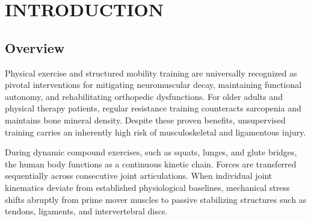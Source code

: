 \documentclass[12pt,a4paper]{report}
\begin{document}
\renewcommand*{\contentsname}{\MakeUppercase{Contents}}
\renewcommand*{\listfigurename}{\MakeUppercase{List of Figures}}
\renewcommand*{\listtablename}{\MakeUppercase{List of Tables}}
\renewcommand{\bibname}{REFERENCES}

\tableofcontents
\clearpage

\begingroup
{}
\listoffigures
\clearpage
\endgroup

\begingroup
{}
\listoftables
\clearpage
\endgroup

\renewcommand{\chaptername}{CHAPTER}

\chapter{INTRODUCTION}
\section{Overview}
Physical exercise and structured mobility training are universally recognized as pivotal interventions for mitigating neuromuscular decay, maintaining functional autonomy, and rehabilitating orthopedic dysfunctions. For older adults and physical therapy patients, regular resistance training counteracts sarcopenia and maintains bone mineral density. Despite these proven benefits, unsupervised training carries an inherently high risk of musculoskeletal and ligamentous injury.
\setcounter{page}{1}

During dynamic compound exercises, such as squats, lunges, and glute bridges, the human body functions as a continuous kinetic chain. Forces are transferred sequentially across consecutive joint articulations. When individual joint kinematics deviate from established physiological baselines, mechanical stress shifts abruptly from prime mover muscles to passive stabilizing structures such as tendons, ligaments, and intervertebral discs.
\end{document}
